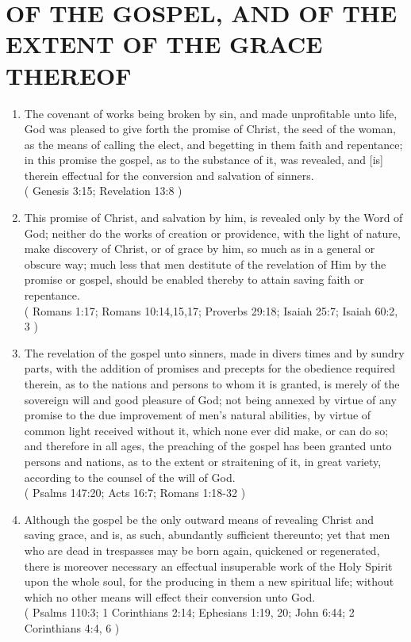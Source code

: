 \documentclass[12pt,a4paper]{book}
\begin{document}
\chapter{OF THE GOSPEL, AND OF THE EXTENT OF THE GRACE THEREOF}
\label{ch-gos-ext}
\begin{enumerate}
\item
\label{ch-gos-ext-1}
The covenant of works being broken by sin, and made unprofitable unto life, God was pleased to give forth the promise of Christ, the seed of the woman, as the means of calling the elect, and begetting in them faith and repentance; in this promise the gospel, as to the substance of it, was revealed, and [is] therein effectual for the conversion and salvation of sinners.\\
( Genesis 3:15; Revelation 13:8 )
\item
\label{ch-gos-ext-2}
This promise of Christ, and salvation by him, is revealed only by the Word of God; neither do the works of creation or providence, with the light of nature, make discovery of Christ, or of grace by him, so much as in a general or obscure way; much less that men destitute of the revelation of Him by the promise or gospel, should be enabled thereby to attain saving faith or repentance.\\
( Romans 1:17; Romans 10:14,15,17; Proverbs 29:18; Isaiah 25:7; Isaiah 60:2, 3 )
\item
\label{ch-gos-ext-3}
The revelation of the gospel unto sinners, made in divers times and by sundry parts, with the addition of promises and precepts for the obedience required therein, as to the nations and persons to whom it is granted, is merely of the sovereign will and good pleasure of God; not being annexed by virtue of any promise to the due improvement of men's natural abilities, by virtue of common light received without it, which none ever did make, or can do so; and therefore in all ages, the preaching of the gospel has been granted unto persons and nations, as to the extent or straitening of it, in great variety, according to the counsel of the will of God.\\
( Psalms 147:20; Acts 16:7; Romans 1:18-32 )
\item
\label{ch-gos-ext-4}
Although the gospel be the only outward means of revealing Christ and saving grace, and is, as such, abundantly sufficient thereunto; yet that men who are dead in trespasses may be born again, quickened or regenerated, there is moreover necessary an effectual insuperable work of the Holy Spirit upon the whole soul, for the producing in them a new spiritual life; without which no other means will effect their conversion unto God.\\
( Psalms 110:3; 1 Corinthians 2:14; Ephesians 1:19, 20; John 6:44; 2 Corinthians 4:4, 6 )
\end{enumerate}
\end{document}
